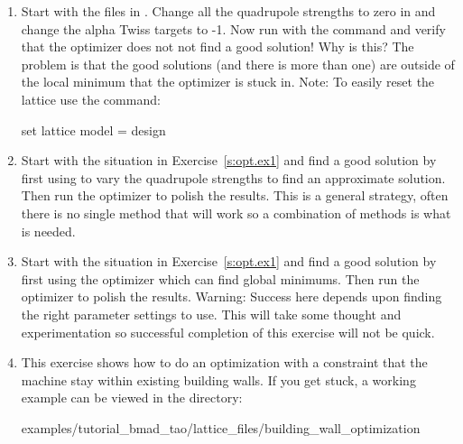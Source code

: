 \documentclass{hitec}     %
\begin{document}
{\begin{enumerate}[label=\thesection.\arabic{enumi}]
\item
\label{s:opt.ex1}
Start with the files in . Change
all the quadrupole strengths to zero in  and change the alpha Twiss  targets
to -1. Now run with the  command and verify that the optimizer does not not find a good
solution! Why is this? The problem is that the good solutions (and there is more than one) are
outside of the local minimum that the optimizer is stuck in. 
Note: To easily reset the lattice use the command:
\begin{code}
set lattice model = design
\end{code}
%
\item
Start with the situation in Exercise~\ref{s:opt.ex1} and find a good solution by first using
 to vary the quadrupole strengths to find an approximate solution. Then run the
 optimizer to polish the results. This is a general strategy, often there is no single method
that will work so a combination of methods is what is needed.
%
\item
Start with the situation in Exercise~\ref{s:opt.ex1} and find a good solution by first using the
 optimizer which can find global minimums. Then run the  optimizer to polish the
results. Warning: Success here depends upon finding the right  parameter settings to
use. This will take some thought and experimentation so successful completion of this exercise will
not be quick.
%
\item
This exercise shows how to do an optimization with a constraint that the machine stay within
existing building walls. If you get stuck, a working example can be viewed in the
directory:
\begin{code}
examples/tutorial_bmad_tao/lattice_files/building_wall_optimization
\end{code}


\end{enumerate}}
\end{document}

